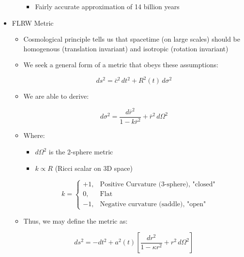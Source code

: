 \begin{itemize}
\begin{itemize}
        \begin{itemize}

          \item Fairly accurate approximation of 14 billion years

        \end{itemize}

    \end{itemize}

  \item FLRW Metric

    \begin{itemize}

      \item Cosmological principle tells us that spacetime (on large scales) should be homogenous (translation invariant) and isotropic (rotation invariant)

      \item We seek a general form of a metric that obeys these assumptions:

        $$ds^2=\bar{c}^2\,dt^2+R^2(t)\,d\sigma^2$$

      \item We are able to derive:

        $$d\sigma^2=\frac{d\bar{r}^2}{1-k\bar{r}^2}+\bar{r}^2\,d\Omega^2$$

      \item Where:

        \begin{itemize}

          \item $d\Omega^2$ is the 2-sphere metric

          \item $k\propto R$ (Ricci scalar on 3D space)

            $$k=\left\{\begin{array}{ll}+1,& \text{Positive Curvature (3-sphere), "closed"}\\ 0,& \text{Flat}\\ -1,&\text{Negative curvature (saddle), "open"}\end{array}$$

        \end{itemize}

      \item Thus, we may define the metric as:

        $$ds^2=-dt^2+a^2(t)\left[ \frac{dr^2}{1-\kappa r^2}+r^2\,d\Omega^2 \right]$$

        \begin{itemize}


\end{itemize}
\end{itemize}
\end{itemize}
